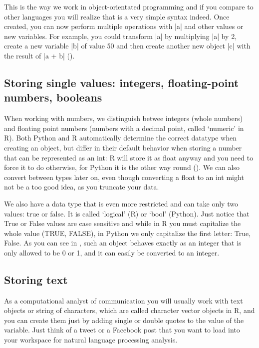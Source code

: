 This is the way we work in object-orientated programming and if you
compare to other languages you will realize that is a very simple
syntax indeed. Once created, you can now perform multiple operations
with |a| and other values or new variables. For example, you
could transform |a| by multiplying |a| by 2, create a new
variable |b| of value 50 and then create another new object
|c| with the result of |a + b| ().





\subsection{Storing single values: integers, floating-point numbers, booleans}

When working with numbers, we distinguish betwee integers (whole
numbers) and floating point numbers (numbers with a decimal point,
called `numeric' in R). Both Python and R automatically determine the
correct datatype when creating an object, but differ in their default
behavior when storing a number that can be represented as an int: R
will store it as float anyway and you need to force it to do
otherwise, for Python it is the other way round
(). We can also convert between types later on,
even though converting a float to an int might not be a too good idea,
as you truncate your data.

We also have a data type that is even more restricted and can take
only two values: true or false. It is called `logical' (R) or `bool'
(Python).  Just notice that True or False values are case sensitive
and while in R you must capitalize the whole value (TRUE, FALSE), in
Python we only capitalize the first letter: True, False.  As you can
see in , such an object behaves exactly as an integer that
is only allowed to be 0 or 1, and it can easily be converted to an
integer.





\subsection{Storing text}

As a computational analyst of communication you will usually work with
text objects or string of characters, which are called character
vector objects in R, and you can create them just by adding single or
double quotes to the value of the variable. Just think of a tweet or a
Facebook post that you want to load into your workspace for natural
language processing analysis.

